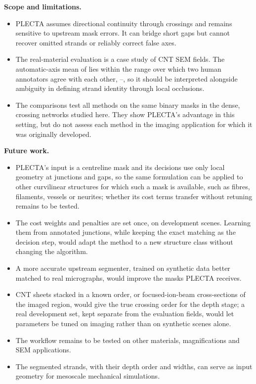 \noindent\textbf{Scope and limitations.}

\begin{itemize}[leftmargin=1.5em,label=\textbullet,topsep=6pt,itemsep=2pt,parsep=0pt]
  \item PLECTA assumes directional continuity through crossings and remains
        sensitive to upstream mask errors. It can bridge short gaps but cannot
        recover omitted strands or reliably correct false axes.
  \item The real-material evaluation is a case study of
        \PlectaRealFieldCountLower{} CNT SEM fields. The automatic-axis mean
        \Fone{} of \PlectaRealUNetFOneMean{} lies within the range over which
        two human annotators agree with each other,
        \PlectaInterAnnotatorAgreeFLow{}--\PlectaInterAnnotatorAgreeFHigh{},
        so it should be interpreted alongside ambiguity in defining strand
        identity through local occlusions.
  \item The comparisons test all methods on the same binary masks in the
        dense, crossing networks studied here. They show PLECTA's advantage in
        this setting, but do not assess each method in the imaging application
        for which it was originally developed.
\end{itemize}

\noindent\textbf{Future work.}

\begin{itemize}[leftmargin=1.5em,label=\textbullet,topsep=6pt,itemsep=2pt,parsep=0pt]
  \item PLECTA's input is a centreline mask and its decisions use only local
        geometry at junctions and gaps, so the same formulation can be applied
        to other curvilinear structures for which such a mask is available,
        such as fibres, filaments, vessels or neurites; whether its cost terms
        transfer without retuning remains to be tested.
  \item The cost weights and penalties are set once, on development scenes.
        Learning them from annotated junctions, while keeping the exact
        matching as the decision step, would adapt the method to a new
        structure class without changing the algorithm.
  \item A more accurate upstream segmenter, trained on synthetic data better
        matched to real micrographs, would improve the masks PLECTA receives.
  \item CNT sheets stacked in a known order, or focused-ion-beam cross-sections
        of the imaged region, would give the true crossing order for the depth
        stage; a real development set, kept separate from the evaluation fields,
        would let parameters be tuned on imaging rather than on synthetic scenes
        alone.
  \item The workflow remains to be tested on other materials, magnifications and
        SEM applications.
  \item The segmented strands, with their depth order and widths, can serve as
        input geometry for mesoscale mechanical simulations.
\end{itemize}
